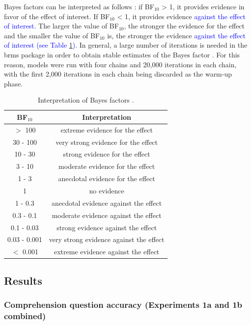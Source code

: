 \documentclass[a4paper, man, floatsintext]{apa7}
\begin{document}
Bayes factors can be interpreted as follows \parencite[e.g., ][]{lee2014bayesian}: if BF$_{10}$ > 1, it provides evidence in favor of the effect of interest. If BF$_{10}$ < 1, it provides evidence \textcolor{blue}{against the effect of interest}. The larger the value of BF$_{10}$, the stronger the evidence for the effect and the smaller the value of BF$_{10}$ is, the stronger the evidence \textcolor{blue}{against the effect of interest (see Table \ref{tab:bf_interpretation})}. 
In general, a large number of iterations is needed in the brms package in order to obtain stable estimates of the Bayes factor  \citep{schad_etal_2022_BF}.
For this reason, models were run with four chains and 20,000 iterations in each chain, with the first 2,000 iterations in each chain being discarded as the warm-up phase.

\begin{table}[h]
    \centering
    \caption{Interpretation of Bayes factors \parencite{lee2014bayesian}.}
    \label{tab:bf_interpretation}
    \begin{tabular}{cc}
    \toprule
    BF$_{10}$ & Interpretation \\
    \midrule
$>$ 100 & extreme evidence for the effect\\
30 - 100 & very strong evidence for the effect\\
10 - 30 & strong evidence for the effect\\
3 - 10 & moderate evidence for the effect\\
1 - 3 &	anecdotal evidence for the effect\\
1  &	no evidence\\
1 - 0.3 & anecdotal evidence against the effect\\
0.3 - 0.1 & moderate evidence against the effect\\
0.1 - 0.03 & strong evidence against the effect\\
0.03 - 0.001 & very strong evidence against the effect\\
$<$ 0.001 & extreme evidence against the effect\\
\bottomrule
    \end{tabular}
\end{table}


\subsection{Results}
\subsubsection{Comprehension question accuracy (Experiments 1a and 1b combined)}
\end{document}
